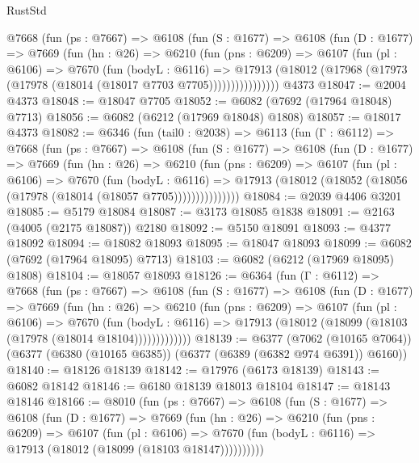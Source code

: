 \begin{lexlean}{RustStd}
\begin{coremodule}
        @7668
          (fun (ps : @7667) =>
          @6108
            (fun (S : @1677) =>
            @6108
              (fun (D : @1677) =>
              @7669
                (fun (hn : @26) =>
                @6210
                  (fun (pns : @6209) =>
                  @6107
                    (fun (pl : @6106) =>
                    @7670
                      (fun (bodyL : @6116) =>
                      @17913
                        (@18012 (@17968 (@17973 (@17978 (@18014 (@18017 @7703 @7705))))))))))))))))
    @4373
@18047 := @2004 @4373
@18048 := @18047 @7705
@18052 := @6082 (@7692 (@17964 @18048) @7713)
@18056 := @6082 (@6212 (@17969 @18048) @1808)
@18057 := @18017 @4373
@18082 := @6346
    (fun (tail0 : @2038) =>
    @6113
      (fun (Γ : @6112) =>
      @7668
        (fun (ps : @7667) =>
        @6108
          (fun (S : @1677) =>
          @6108
            (fun (D : @1677) =>
            @7669
              (fun (hn : @26) =>
              @6210
                (fun (pns : @6209) =>
                @6107
                  (fun (pl : @6106) =>
                  @7670
                    (fun (bodyL : @6116) =>
                    @17913 (@18012 (@18052 (@18056 (@17978 (@18014 (@18057 @7705)))))))))))))))
@18084 := @2039 @4406 @3201
@18085 := @5179 @18084
@18087 := @3173 @18085 @1838
@18091 := @2163 (@4005 (@2175 @18087)) @2180
@18092 := @5150 @18091
@18093 := @4377 @18092
@18094 := @18082 @18093
@18095 := @18047 @18093
@18099 := @6082 (@7692 (@17964 @18095) @7713)
@18103 := @6082 (@6212 (@17969 @18095) @1808)
@18104 := @18057 @18093
@18126 := @6364
    (fun (Γ : @6112) =>
    @7668
      (fun (ps : @7667) =>
      @6108
        (fun (S : @1677) =>
        @6108
          (fun (D : @1677) =>
          @7669
            (fun (hn : @26) =>
            @6210
              (fun (pns : @6209) =>
              @6107
                (fun (pl : @6106) =>
                @7670
                  (fun (bodyL : @6116) =>
                  @17913 (@18012 (@18099 (@18103 (@17978 (@18014 @18104)))))))))))))
@18139 := @6377
    (@7062 (@10165 @7064))
    (@6377 (@6380 (@10165 @6385)) (@6377 (@6389 (@6382 @974 @6391)) @6160))
@18140 := @18126 @18139
@18142 := @17976 (@6173 @18139)
@18143 := @6082 @18142
@18146 := @6180 @18139 @18013 @18104
@18147 := @18143 @18146
@18166 := @8010
    (fun (ps : @7667) =>
    @6108
      (fun (S : @1677) =>
      @6108
        (fun (D : @1677) =>
        @7669
          (fun (hn : @26) =>
          @6210
            (fun (pns : @6209) =>
            @6107
              (fun (pl : @6106) =>
              @7670 (fun (bodyL : @6116) => @17913 (@18012 (@18099 (@18103 @18147))))))))))

\end{coremodule}
\end{lexlean}
